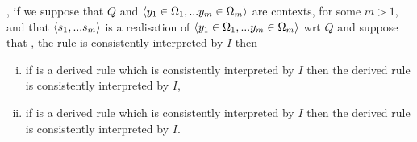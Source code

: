 \begin{lemma}
\IfIpartialmappingUtoC,
if we suppose that $Q$ and $\langle y_1 \in \Omega_1,... y_{m} \in \Omega_{m}\rangle$ are contexts, for some $m >1$, and that $\langle s_1,...s_{m}\rangle$ is a realisation of $\langle y_1 \in \Omega_1,... y_{m} \in \Omega_{m}\rangle$ wrt $Q$ and
suppose that \foreachj, the rule
 is consistently interpreted by $I$ then
\begin{enumerate}[(i)]
\item if \ZOmega is a derived rule which is consistently interpreted by $I$
then the derived rule 
\ZOmegaSUBsmFORym is consistently interpreted by $I$,
\item if \ZsOmega is a derived rule which is consistently interpreted by $I$
then the derived rule 
\ZsOmegaSUBsmFORym is consistently interpreted by $I$.
\end{enumerate}
\end{lemma}
